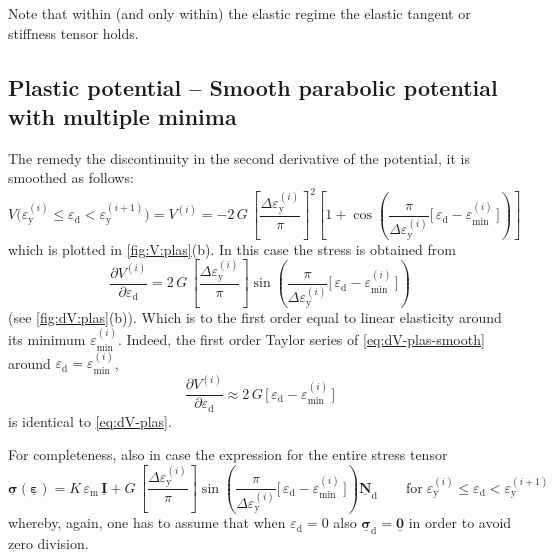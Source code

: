 \documentclass[fleqn, colorlinks]{goose-article}
\newcommand\T[1]{\underline{\bm{{#1}}}}
\begin{document}
Note that within (and only within) the elastic regime the
elastic tangent or stiffness tensor holds.

\subsection{Plastic potential -- Smooth parabolic potential with multiple minima}

The remedy the discontinuity in the second derivative of the potential, it is smoothed as follows:
\begin{equation}
    \label{eq:V-plas-smooth}
    V \big(
        \varepsilon_\mathrm{y}^{(i)} \leq \varepsilon_\mathrm{d} < \varepsilon_\mathrm{y}^{(i+1)}
    \big)
    =
    V^{(i)}
    =
    - 2 \, G \,
    \left[ \frac{\Delta \varepsilon_\mathrm{y}^{(i)}}{\pi} \right]^2
    \left[
        1 + \cos \left(
          \frac{ \pi }{ \Delta \varepsilon_\mathrm{y}^{(i)} }
          \Big[\, \varepsilon_\mathrm{d} - \varepsilon_\mathrm{min}^{(i)} \,\Big]
        \right)
    \right]
\end{equation}
which is plotted in \cref{fig:V:plas}(b).
In this case the stress is obtained from
\begin{equation}
    \label{eq:dV-plas-smooth}
    \frac{\partial V^{(i)}}{\partial \varepsilon_\mathrm{d}}
    =
    2 \, G \,
    \left[ \frac{\Delta \varepsilon_\mathrm{y}^{(i)}}{\pi} \right]
    \sin \left(
        \frac{ \pi }{ \Delta \varepsilon_\mathrm{y}^{(i)} }
        \Big[\, \varepsilon_\mathrm{d} - \varepsilon_\mathrm{min}^{(i)} \,\Big]
    \right)
\end{equation}
(see \cref{fig:dV:plas}(b)).
Which is to the first order equal to linear elasticity around its minimum
$\varepsilon_\mathrm{min}^{(i)}$.
Indeed, the first order Taylor series of \cref{eq:dV-plas-smooth} around
$\varepsilon_\mathrm{d} = \varepsilon_\mathrm{min}^{(i)}$,
\begin{equation}
    \frac{\partial V^{(i)}}{\partial \varepsilon_\mathrm{d}}
    \approx
    2 \, G \, \Big[\, \varepsilon_\mathrm{d} - \varepsilon_\mathrm{min}^{(i)} \,\Big]
\end{equation}
is identical to \cref{eq:dV-plas}.

For completeness, also in case the expression for the entire stress tensor
\begin{equation}
    \T{\sigma} ( \T{\varepsilon} )
    =
    K \, \varepsilon_\mathrm{m} \, \T{I}
    +
    G \,
    \left[ \frac{\Delta \varepsilon_\mathrm{y}^{(i)}}{\pi} \right]
    \sin \left(
        \frac{ \pi }{ \Delta \varepsilon_\mathrm{y}^{(i)} }
        \Big[\, \varepsilon_\mathrm{d} - \varepsilon_\mathrm{min}^{(i)} \,\Big]
    \right)
    \T{N}_\mathrm{d}
    \qquad
    \mathrm{for}
    \;
    \varepsilon_\mathrm{y}^{(i)} \leq \varepsilon_\mathrm{d} < \varepsilon_\mathrm{y}^{(i+1)}
\end{equation}
whereby, again, one has to assume that when $\varepsilon_\mathrm{d} = 0$ also
$\T{\sigma}_\mathrm{d} = \T{0}$ in order to avoid zero division.
\end{document}
